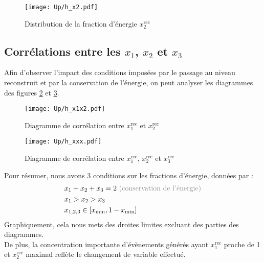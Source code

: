 \documentclass[a4paper]{article} %
\numberwithin{equation}{section} %
\theoremstyle{definition}
\theoremstyle{remark}
\theoremstyle{plain}%
\theoremstyle{style_exemple}
\newcommand{\com}[1]{\textcolor{Gray}{(#1)}} %
\begin{document}
\begin{figure}[H]
    \centering
    \texttt{[image: Up/h\_x2.pdf]}
    \begin{minipage}{12cm}
        \caption{Distribution de la fraction d'énergie $x_2^\text{rec}$}
        \label{fig:x2}
    \end{minipage}
\end{figure}

\subsection{Corrélations entre les $x_1$, $x_2$ et $x_3$}

Afin d'observer l'impact des conditions imposées par le passage au niveau reconstruit et par la conservation de l'énergie, on peut analyser les diagrammes des figures \ref{fig:x1x2} et \ref{fig:x1x2x3}.
\begin{figure}[H]
    \centering
    \texttt{[image: Up/h\_x1x2.pdf]}
    \begin{minipage}{12cm}
        \caption{Diagramme de corrélation entre $x_1^\text{rec}$ et $x_2^\text{rec}$}%
        \label{fig:x1x2}
    \end{minipage}
\end{figure}

\begin{figure}[H]
    \centering
    \texttt{[image: Up/h\_xxx.pdf]}
    \begin{minipage}{12cm}
        \caption{Diagramme de corrélation entre $x_1^\text{rec}$, $x_2^\text{rec}$ et $x_3^\text{rec}$}%
        \label{fig:x1x2x3}
    \end{minipage}
\end{figure}

Pour résumer, nous avons 3 conditions sur les fractions d'énergie, données par :
\begin{align}
    &x_1+x_2+x_3 = 2 \ \text{\com{conservation de l'énergie}}
    \label{eq:cdt1}\\
    &x_1>x_2>x_3
    \label{eq:cdt2}\\
    &x_{1,2,3} \in [x_{\text{min}},1-x_{\text{min}}]
    \label{eq:cdt3}
\end{align}
Graphiquement, cela nous mets des droites limites excluant des parties des diagrammes.\\
De plus, la concentration importante d'évènements générés ayant $x_1^\text{rec}$ proche de 1 et $x_2^\text{rec}$ maximal reflète le changement de variable effectué.
\end{document}
